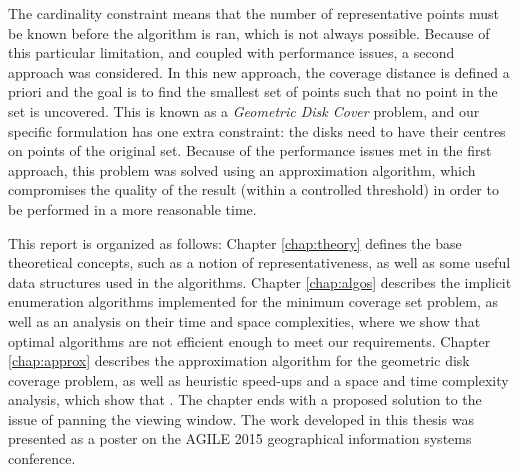 The cardinality constraint means that the number of representative points must be known before the algorithm is ran, which is not always possible. Because of this particular limitation, and coupled with performance issues, a second approach was considered. In this new approach, the coverage distance is defined a priori and the goal is to find the smallest set of points such that no point in the set is uncovered. This is known as a \emph{Geometric Disk Cover}\cite{gdc} problem, and our specific formulation has one extra constraint: the disks need to have their centres on points of the original set. Because of the performance issues met in the first approach, this problem was solved using an approximation algorithm, which compromises the quality of the result (within a controlled threshold) in order to be performed in a more reasonable time. 

\begin{change}
This report is organized as follows:
Chapter \ref{chap:theory} defines the base theoretical concepts, such as a notion of representativeness, as well as some useful data structures used in the algorithms. Chapter \ref{chap:algos} describes the implicit enumeration algorithms implemented for the minimum coverage set problem, as well as an analysis on their time and space complexities, where we show that optimal algorithms are not efficient enough to meet our requirements. Chapter \ref{chap:approx} describes the approximation algorithm for the geometric disk coverage problem, as well as heuristic speed-ups and a space and time complexity analysis, which show that . The chapter ends with a proposed solution to the issue of panning the viewing window. The work developed in this thesis was presented as a poster on the AGILE 2015 geographical information systems conference.
\end{change}